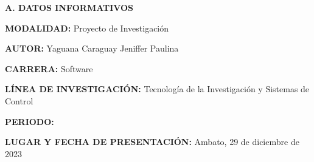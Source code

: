 


\setcounter{page}{2}

\tableofcontents
\pagebreak


\begin{center}
	\textbf{A. DATOS INFORMATIVOS}
\end{center}\par
\textbf{MODALIDAD: } Proyecto de Investigación\par
\textbf{AUTOR: } Yaguana Caraguay Jeniffer Paulina\par
\textbf{CARRERA: } Software\par
\textbf{LÍNEA DE INVESTIGACIÓN: } Tecnología de la Investigación y Sistemas de Control\par
\textbf{PERIODO: } \periodo\par
\textbf{LUGAR Y FECHA DE PRESENTACIÓN: } Ambato, 29 de diciembre de 2023
\pagebreak
